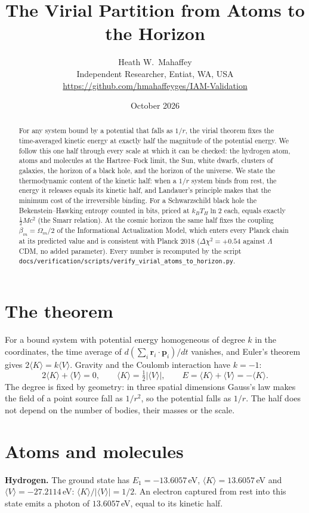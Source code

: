 \documentclass[11pt,a4paper]{article}
\title{\textbf{The Virial Partition from Atoms to the Horizon}}
\author{Heath W.\ Mahaffey\\ \small Independent Researcher, Entiat, WA, USA\\ \small \url{https://github.com/hmahaffeyges/IAM-Validation}}
\date{October 2026}
\begin{document}
\maketitle
\begin{abstract}
For any system bound by a potential that falls as $1/r$, the virial theorem fixes the time-averaged kinetic energy at exactly half the magnitude of the
potential energy. We follow this one half through every scale at which it can be checked: the hydrogen atom, atoms and molecules at the Hartree--Fock limit,
the Sun, white dwarfs, clusters of galaxies, the horizon of a black hole, and the horizon of the universe. We state the thermodynamic content of the kinetic
half: when a $1/r$ system binds from rest, the energy it releases equals its kinetic half, and Landauer's principle makes that the minimum cost of the
irreversible binding. For a Schwarzschild black hole the Bekenstein--Hawking entropy counted in bits, priced at $k_BT_H\ln2$ each, equals exactly
$\tfrac12Mc^2$ (the Smarr relation). At the cosmic horizon the same half fixes the coupling $\beta_m=\Omega_m/2$ of the Informational Actualization Model,
which enters every Planck chain at its predicted value and is consistent with Planck 2018 ($\Delta\chi^2=+0.54$ against $\Lambda$CDM, no added parameter).
Every number is recomputed by the script \texttt{docs/verification/scripts/verify\_virial\_atoms\_to\_horizon.py}.
\end{abstract}

\section{The theorem}
For a bound system with potential energy homogeneous of degree $k$ in the coordinates, the time average of $d(\sum_i\mathbf r_i\cdot\mathbf p_i)/dt$ vanishes,
and Euler's theorem gives $2\langle K\rangle=k\langle V\rangle$. Gravity and the Coulomb interaction have $k=-1$:
\begin{equation}
2\langle K\rangle+\langle V\rangle=0,\qquad \langle K\rangle=\tfrac12|\langle V\rangle|,\qquad E=\langle K\rangle+\langle V\rangle=-\langle K\rangle .
\label{eq:virial}
\end{equation}
The degree is fixed by geometry: in three spatial dimensions Gauss's law makes the field of a point source fall as $1/r^2$, so the potential falls as $1/r$.
The half does not depend on the number of bodies, their masses or the scale.

\section{Atoms and molecules}
\textbf{Hydrogen.} The ground state has $E_1=-13.6057$\,eV, $\langle K\rangle=13.6057$\,eV and $\langle V\rangle=-27.2114$\,eV: $\langle K\rangle/|\langle V\rangle|=1/2$.
An electron captured from rest into this state emits a photon of $13.6057$\,eV, equal to its kinetic half.
\end{document}
